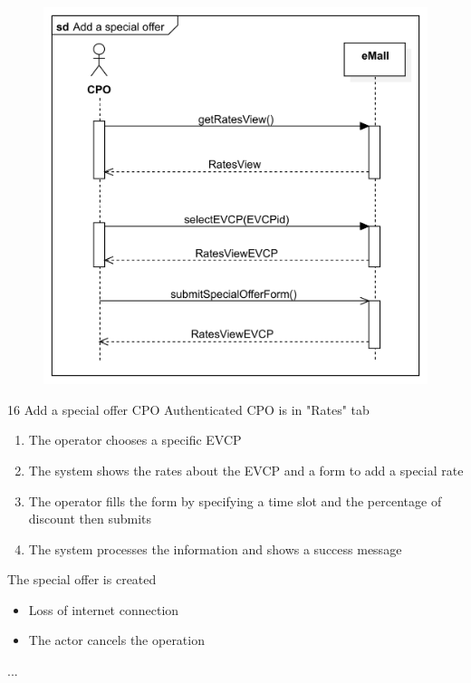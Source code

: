 \pagebreak
\usecase
{
    \begin{figure}[H]
        \centering
        \includegraphics[scale=0.9]{src/sequence_diagram/specialOffer.png}
    \end{figure}
}
{16}
{Add a special offer} %
{CPO} %
{Authenticated CPO is in "Rates" tab} %
{ %
    \begin{enumerate}
        \item The operator chooses a specific EVCP
        \item The system shows the rates about the EVCP and a form to add a special rate
        \item The operator fills the form by specifying a time slot and the percentage of discount then submits
        \item The system processes the information and shows a success message
    \end{enumerate}
}
{The special offer is created} %
{ %
    \begin{itemize}
        \item Loss of internet connection
        \item The actor cancels the operation
    \end{itemize}
}
{ %
    ...
}


